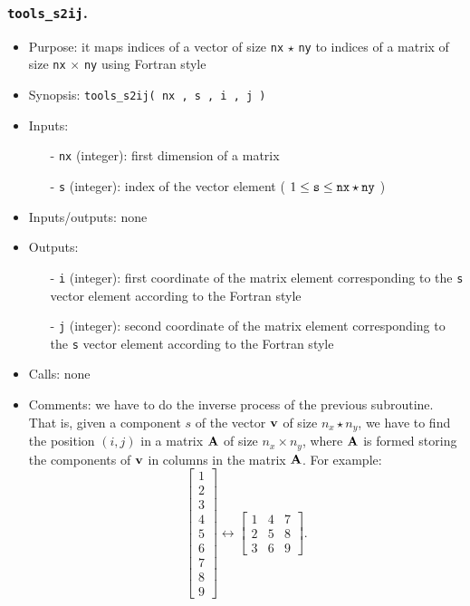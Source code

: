 \documentclass[12pt]{article}
\begin{document}
\subsubsection{{\tt tools\_s2ij}.}
\begin{itemize}
\item Purpose: it maps indices of a vector of size {\tt nx} $\star$ {\tt ny} to indices of a matrix of size {\tt nx} $\times$ {\tt ny} using Fortran style
\item Synopsis: {\tt tools\_s2ij( nx , s , i , j )}
\item Inputs: 
\begin{itemize}
\item[-] {\tt nx} (integer): first dimension of a matrix
\item[-] {\tt s} (integer): index of the vector element ( $1 \leq {\tt s} \leq {\tt nx} \star {\tt ny}$ )
\end{itemize}
\item Inputs/outputs: none
\item Outputs:
\begin{itemize}
\item[-] {\tt i} (integer): first coordinate of the matrix element corresponding to the {\tt s} vector element according to the Fortran style 
\item[-] {\tt j} (integer): second coordinate of the matrix element corresponding to the {\tt s} vector element according to the Fortran style 
\end{itemize}
\item Calls: none
\item Comments: we have to do the inverse process of the previous subroutine. That is, given a component $s$ of the vector ${\bf v}$ of size $n_x \star n_y$, we have to find the position $\left( i , j \right)$ in a matrix ${\bf A}$ of size $n_x \times n_y$, where ${\bf A}$ is formed storing the components of ${\bf v}$ in columns in the matrix ${\bf A}$. For example:
\begin{equation}
\left[ \begin{array}{c} 1 \\ 2 \\ 3 \\ 4 \\ 5 \\ 6 \\ 7 \\ 8 \\ 9 \end{array} \right] \longleftrightarrow \left[ \begin{array}{ccc} 1 & 4 & 7 \\ 2 & 5 & 8 \\ 3 & 6 & 9 \end{array} \right]. 

\end{equation}
\end{itemize}
\end{document}
